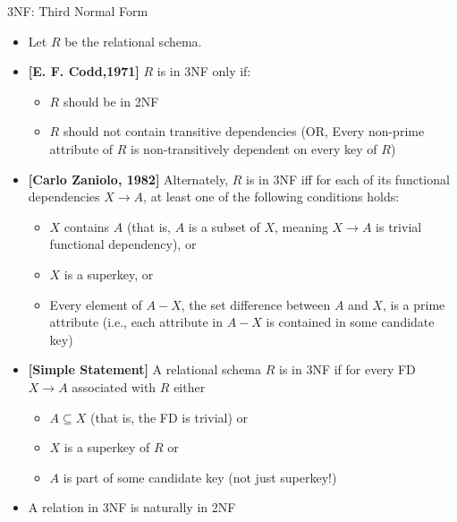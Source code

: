 \documentclass[aspectratio=169, xcolor=dvipsnames]{beamer}
\begin{document}
\begin{frame}{3NF: Third Normal Form}
    \begin{itemize}[<+->]
        \item Let $R$ be the relational schema.
        \item \textbf{[E. F. Codd,1971]} $R$ is in 3NF only if:
        \begin{itemize}
            \item[$\triangleright$] $R$ should be in 2NF
            \item[$\triangleright$] $R$ should not contain transitive dependencies (OR, Every non-prime attribute of $R$ is non-transitively dependent on every key of $R$)
        \end{itemize}
        \item \textbf{[Carlo Zaniolo, 1982]} Alternately, $R$ is in 3NF iff for each of its functional dependencies $X \rightarrow A$, at least one of the following conditions holds:
        \begin{itemize}
            \item[$\triangleright$] $X$ contains $A$ (that is, $A$ is a subset of $X$, meaning $X \rightarrow A$ is trivial functional dependency), or
            \item[$\triangleright$] $X$ is a superkey, or
            \item[$\triangleright$] Every element of $A - X$, the set difference between $A$ and $X$, is a prime attribute (i.e., each attribute in $A - X$ is contained in some candidate key)
        \end{itemize}
        \item \textbf{[Simple Statement]} A relational schema $R$ is in 3NF if for every FD $X \rightarrow A$ associated with $R$ either
        \begin{itemize}
            \item[$\triangleright$] $A \subseteq X$ (that is, the FD is trivial) or
            \item[$\triangleright$] $X$ is a superkey of $R$ or
            \item[$\triangleright$] $A$ is part of some candidate key (not just superkey!)
        \end{itemize}
        \item A relation in 3NF is naturally in 2NF
    \end{itemize}
\end{frame}
\end{document}

